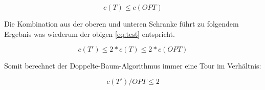 \documentclass{article}
\begin{document}
\begin{equation}
c(T) \leq c(OPT)
\end{equation}

Die Kombination aus der oberen und unteren Schranke führt zu folgendem Ergebnis was wiederum der obigen \autoref{eq:test} entspricht.

\begin{equation}
c(T') \leq 2 * c(T) \leq 2 * c(OPT)
\end{equation}

Somit berechnet der Doppelte-Baum-Algorithmus immer eine Tour im Verhältnis:

\begin{equation}
c(T')/OPT \leq 2
\end{equation}


%
%
%
\nocite{busing2010graphen}
\nocite{jungnickel1994graphen}
\printbibliography[heading=bibnumbered,title={Literatur}]
\end{document}
